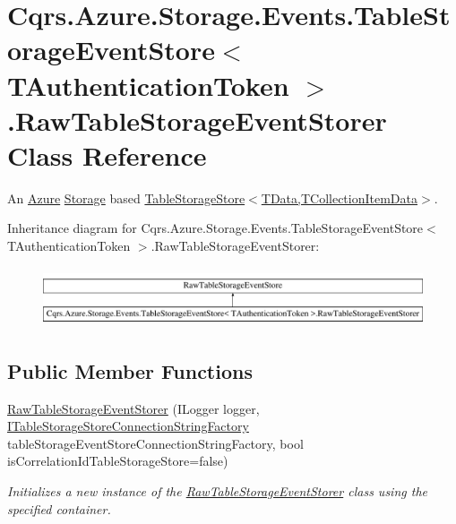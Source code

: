 \hypertarget{classCqrs_1_1Azure_1_1Storage_1_1Events_1_1TableStorageEventStore_1_1RawTableStorageEventStorer}{}\section{Cqrs.\+Azure.\+Storage.\+Events.\+Table\+Storage\+Event\+Store$<$ T\+Authentication\+Token $>$.Raw\+Table\+Storage\+Event\+Storer Class Reference}
\label{classCqrs_1_1Azure_1_1Storage_1_1Events_1_1TableStorageEventStore_1_1RawTableStorageEventStorer}


An \hyperlink{namespaceCqrs_1_1Azure}{Azure} \hyperlink{namespaceCqrs_1_1Azure_1_1Storage}{Storage} based \hyperlink{classCqrs_1_1Azure_1_1BlobStorage_1_1Events_1_1TableStorageEventStore_ad86c24c28321c16b1f3601b3e7d870c4_ad86c24c28321c16b1f3601b3e7d870c4}{Table\+Storage\+Store$<$\+T\+Data,\+T\+Collection\+Item\+Data$>$}.  


Inheritance diagram for Cqrs.\+Azure.\+Storage.\+Events.\+Table\+Storage\+Event\+Store$<$ T\+Authentication\+Token $>$.Raw\+Table\+Storage\+Event\+Storer\+:\begin{figure}[H]
\begin{center}
\leavevmode
\includegraphics[height=1.777778cm]{classCqrs_1_1Azure_1_1Storage_1_1Events_1_1TableStorageEventStore_1_1RawTableStorageEventStorer}
\end{center}
\end{figure}
\subsection*{Public Member Functions}
\begin{DoxyCompactItemize}
\item 
\hyperlink{classCqrs_1_1Azure_1_1Storage_1_1Events_1_1TableStorageEventStore_1_1RawTableStorageEventStorer_af5ed87f6a4d32ff3581a6d2ae107dcd1_af5ed87f6a4d32ff3581a6d2ae107dcd1}{Raw\+Table\+Storage\+Event\+Storer} (I\+Logger logger, \hyperlink{interfaceCqrs_1_1Azure_1_1BlobStorage_1_1ITableStorageStoreConnectionStringFactory}{I\+Table\+Storage\+Store\+Connection\+String\+Factory} table\+Storage\+Event\+Store\+Connection\+String\+Factory, bool is\+Correlation\+Id\+Table\+Storage\+Store=false)
\begin{DoxyCompactList}\small\item\em Initializes a new instance of the \hyperlink{classCqrs_1_1Azure_1_1Storage_1_1Events_1_1TableStorageEventStore_1_1RawTableStorageEventStorer}{Raw\+Table\+Storage\+Event\+Storer} class using the specified container. \end{DoxyCompactList}\end{DoxyCompactItemize}
